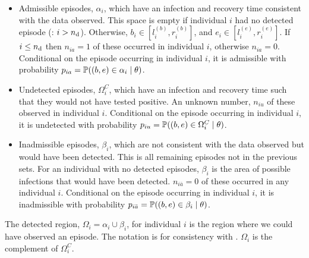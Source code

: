 \documentclass[thesis.tex]{subfiles}
\begin{document}
\begin{itemize}
\item
  Admissible episodes, $\alpha_i$, which have an infection and recovery time consistent with the data observed.
  This space is empty if individual $i$ had no detected episode (\ie: $i > n_\text{d}$).
  Otherwise, $b_i \in [l_i^{(b)}, r_i^{(b)}]$, and $e_i \in [l_i^{(e)}, r_i^{(e)}]$.
  If $i \leq n_\text{d}$ then $n_{ia} =1$ of these occurred in individual $i$, otherwise $n_{ia} = 0$.
  Conditional on the episode occurring in individual $i$, it is admissible with probability $p_{ia} = \operatorname{\mathbb{P}}((b, e) \in \alpha_i \mid \theta)$.
  \label{perf-test:def:admissible}
\item
  Undetected episodes, $\Omega_i^C$, which have an infection and recovery time such that they would not have tested positive.
  An unknown number, $n_{iu}$ of these observed in individual $i$.
  Conditional on the episode occurring in individual $i$, it is undetected with probability $p_{iu} = \operatorname{\mathbb{P}}((b, e) \in \Omega^C_i \mid \theta)$.
\item
  Inadmissible episodes, $\beta_i$, which are not consistent with the data observed but would have been
  detected.
  This is all remaining episodes not in the previous sets.
  For an individual with no detected episodes, $\beta_i$ is the area of possible infections that would have been detected.
  $n_{i\bar{a}} = 0$ of these occurred in any individual $i$.
  Conditional on the episode occurring in individual $i$, it is inadmissible with probability $p_{i\bar{a}} = \operatorname{\mathbb{P}}((b, e) \in \beta_i \mid \theta)$.
\end{itemize}

The detected region, $\Omega_i = \alpha_i \cup \beta_i$, for individual $i$ is the region where we could have observed an episode. 
The notation is for consistency with \textcite{heiseyModelling}.
$\Omega_i$ is the complement of $\Omega^C_i$.
\end{document}
